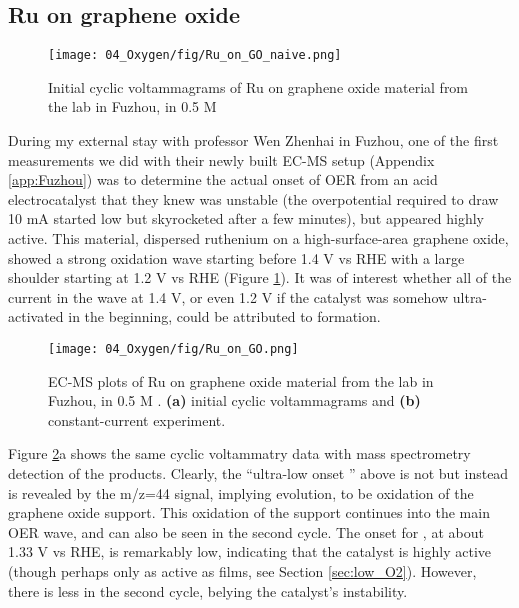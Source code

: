 \subsection{Ru on graphene oxide}

\begin{figure}[b!]
	\centering
	\texttt{[image: 04\_Oxygen/fig/Ru\_on\_GO\_naive.png]}
	\caption{Initial cyclic voltammagrams of Ru on graphene oxide material from the lab in Fuzhou, in 0.5 M }
	\label{fig:Ru_on_GO_naive}
\end{figure}

During my external stay with professor Wen Zhenhai in Fuzhou, one of the first measurements we did with their newly built EC-MS setup (Appendix \ref{app:Fuzhou}) was to determine the actual onset of OER from an acid electrocatalyst that they knew was unstable (the overpotential required to draw 10 mA started low but skyrocketed after a few minutes), but appeared highly active. This material, dispersed ruthenium on a high-surface-area graphene oxide, showed a strong oxidation wave starting before 1.4 V vs RHE with a large shoulder starting at 1.2 V vs RHE (Figure \ref{fig:Ru_on_GO_naive}). It was of interest whether all of the current in the wave at 1.4 V, or even 1.2 V if the catalyst was somehow ultra-activated in the beginning, could be attributed to  formation.

\begin{figure}[t]
	\centering
	\texttt{[image: 04\_Oxygen/fig/Ru\_on\_GO.png]}
	\caption{EC-MS plots of Ru on graphene oxide material from the lab in Fuzhou, in 0.5 M . \textbf{(a)} initial cyclic voltammagrams and \textbf{(b)} constant-current experiment.}
	\label{fig:Ru_on_GO}
\end{figure}

Figure \ref{fig:Ru_on_GO}a shows the same cyclic voltammatry data with mass spectrometry detection of the products. Clearly, the ``ultra-low onset '' above is not  but instead is revealed by the m/z=44 signal, implying  evolution, to be oxidation of the graphene oxide support. This oxidation of the support continues into the main OER wave, and can also be seen in the second cycle. The onset for , at about 1.33 V vs RHE, is remarkably low, indicating that the catalyst is highly active (though perhaps only as active as  films, see Section \ref{sec:low_O2}). However, there is less  in the second cycle, belying the catalyst's instability.

